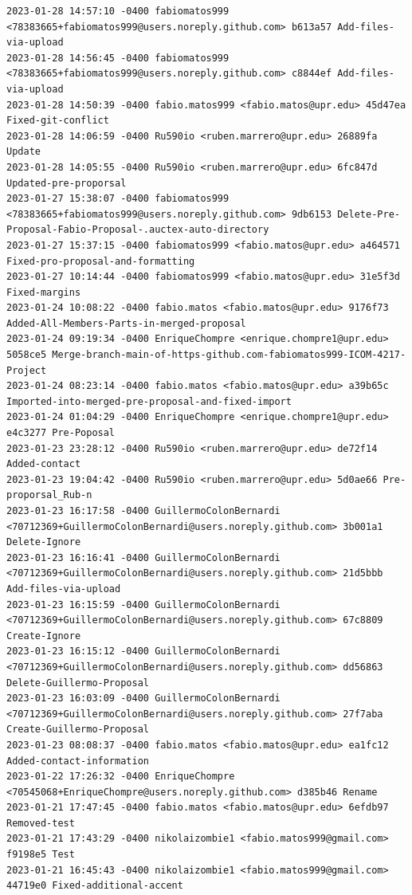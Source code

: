 \documentclass[12pt]{article}
\begin{document}
\begin{lstlisting}
2023-01-28 14:57:10 -0400 fabiomatos999 <78383665+fabiomatos999@users.noreply.github.com> b613a57 Add-files-via-upload
2023-01-28 14:56:45 -0400 fabiomatos999 <78383665+fabiomatos999@users.noreply.github.com> c8844ef Add-files-via-upload
2023-01-28 14:50:39 -0400 fabio.matos999 <fabio.matos@upr.edu> 45d47ea Fixed-git-conflict
2023-01-28 14:06:59 -0400 Ru590io <ruben.marrero@upr.edu> 26889fa Update
2023-01-28 14:05:55 -0400 Ru590io <ruben.marrero@upr.edu> 6fc847d Updated-pre-proporsal
2023-01-27 15:38:07 -0400 fabiomatos999 <78383665+fabiomatos999@users.noreply.github.com> 9db6153 Delete-Pre-Proposal-Fabio-Proposal-.auctex-auto-directory
2023-01-27 15:37:15 -0400 fabiomatos999 <fabio.matos@upr.edu> a464571 Fixed-pro-proposal-and-formatting
2023-01-27 10:14:44 -0400 fabiomatos999 <fabio.matos@upr.edu> 31e5f3d Fixed-margins
2023-01-24 10:08:22 -0400 fabio.matos <fabio.matos@upr.edu> 9176f73 Added-All-Members-Parts-in-merged-proposal
2023-01-24 09:19:34 -0400 EnriqueChompre <enrique.chompre1@upr.edu> 5058ce5 Merge-branch-main-of-https-github.com-fabiomatos999-ICOM-4217-Project
2023-01-24 08:23:14 -0400 fabio.matos <fabio.matos@upr.edu> a39b65c Imported-into-merged-pre-proposal-and-fixed-import
2023-01-24 01:04:29 -0400 EnriqueChompre <enrique.chompre1@upr.edu> e4c3277 Pre-Poposal
2023-01-23 23:28:12 -0400 Ru590io <ruben.marrero@upr.edu> de72f14 Added-contact
2023-01-23 19:04:42 -0400 Ru590io <ruben.marrero@upr.edu> 5d0ae66 Pre-proporsal_Rub-n
2023-01-23 16:17:58 -0400 GuillermoColonBernardi <70712369+GuillermoColonBernardi@users.noreply.github.com> 3b001a1 Delete-Ignore
2023-01-23 16:16:41 -0400 GuillermoColonBernardi <70712369+GuillermoColonBernardi@users.noreply.github.com> 21d5bbb Add-files-via-upload
2023-01-23 16:15:59 -0400 GuillermoColonBernardi <70712369+GuillermoColonBernardi@users.noreply.github.com> 67c8809 Create-Ignore
2023-01-23 16:15:12 -0400 GuillermoColonBernardi <70712369+GuillermoColonBernardi@users.noreply.github.com> dd56863 Delete-Guillermo-Proposal
2023-01-23 16:03:09 -0400 GuillermoColonBernardi <70712369+GuillermoColonBernardi@users.noreply.github.com> 27f7aba Create-Guillermo-Proposal
2023-01-23 08:08:37 -0400 fabio.matos <fabio.matos@upr.edu> ea1fc12 Added-contact-information
2023-01-22 17:26:32 -0400 EnriqueChompre <70545068+EnriqueChompre@users.noreply.github.com> d385b46 Rename
2023-01-21 17:47:45 -0400 fabio.matos <fabio.matos@upr.edu> 6efdb97 Removed-test
2023-01-21 17:43:29 -0400 nikolaizombie1 <fabio.matos999@gmail.com> f9198e5 Test
2023-01-21 16:45:43 -0400 nikolaizombie1 <fabio.matos999@gmail.com> 44719e0 Fixed-additional-accent

\end{lstlisting}
\end{document}
